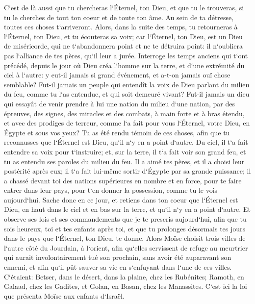 \verse C`est de là aussi que tu chercheras l`Éternel, ton Dieu, et que tu le trouveras, si tu le cherches de tout ton coeur et de toute ton âme. 
\verse Au sein de ta détresse, toutes ces choses t`arriveront. Alors, dans la suite des temps, tu retourneras à l`Éternel, ton Dieu, et tu écouteras sa voix; 
\verse car l`Éternel, ton Dieu, est un Dieu de miséricorde, qui ne t`abandonnera point et ne te détruira point: il n`oubliera pas l`alliance de tes pères, qu`il leur a jurée. 
\verse Interroge les temps anciens qui t`ont précédé, depuis le jour où Dieu créa l`homme sur la terre, et d`une extrémité du ciel à l`autre: y eut-il jamais si grand événement, et a-t-on jamais ouï chose semblable? 
\verse Fut-il jamais un peuple qui entendît la voix de Dieu parlant du milieu du feu, comme tu l`as entendue, et qui soit demeuré vivant? 
\verse Fut-il jamais un dieu qui essayât de venir prendre à lui une nation du milieu d`une nation, par des épreuves, des signes, des miracles et des combats, à main forte et à bras étendu, et avec des prodiges de terreur, comme l`a fait pour vous l`Éternel, votre Dieu, en Égypte et sous vos yeux? 
\verse Tu as été rendu témoin de ces choses, afin que tu reconnusses que l`Éternel est Dieu, qu`il n`y en a point d`autre. 
\verse Du ciel, il t`a fait entendre sa voix pour t`instruire; et, sur la terre, il t`a fait voir son grand feu, et tu as entendu ses paroles du milieu du feu. 
\verse Il a aimé tes pères, et il a choisi leur postérité après eux; il t`a fait lui-même sortir d`Égypte par sa grande puissance; 
\verse il a chassé devant toi des nations supérieures en nombre et en force, pour te faire entrer dans leur pays, pour t`en donner la possession, comme tu le vois aujourd`hui. 
\verse Sache donc en ce jour, et retiens dans ton coeur que l`Éternel est Dieu, en haut dans le ciel et en bas sur la terre, et qu`il n`y en a point d`autre. 
\verse Et observe ses lois et ses commandements que je te prescris aujourd`hui, afin que tu sois heureux, toi et tes enfants après toi, et que tu prolonges désormais tes jours dans le pays que l`Éternel, ton Dieu, te donne. 
\verse Alors Moïse choisit trois villes de l`autre côté du Jourdain, à l`orient, 
\verse afin qu`elles servissent de refuge au meurtrier qui aurait involontairement tué son prochain, sans avoir été auparavant son ennemi, et afin qu`il pût sauver sa vie en s`enfuyant dans l`une de ces villes. 
\verse C`étaient: Betser, dans le désert, dans la plaine, chez les Rubénites; Ramoth, en Galaad, chez les Gadites, et Golan, en Basan, chez les Manassites. 
\verse C`est ici la loi que présenta Moïse aux enfants d`Israël. 
